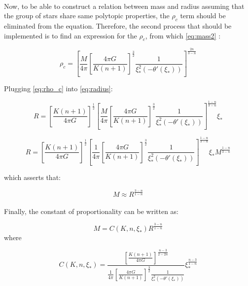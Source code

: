 \documentclass[letterpaper,12pt]{article}
\begin{document}
\paragraph{} Now, to be able to construct a relation between mass and radius assuming that the group of stars share same polytopic properties, the $\rho_c$ term should be eliminated from the equation. Therefore, the second process that should be implemented is to find an expression for the $\rho_c$, from which \eqref{eq:mass2} :

\begin{equation}
    \label{eq:rho_c}
    \rho_c = \left[\frac{M}{4 \pi} \left[\frac{4 \pi G}{K \left(n+1\right)}\right]^{\frac{3}{2}}  \frac{1}{\xi_*^2\left(-\theta'(\xi_*)\right)}\right]^{\frac{2n}{3-n}}
\end{equation}

Plugging \eqref{eq:rho_c} into \eqref{eq:radius}:

\begin{equation*}
    R = \left[\frac{K \left(n+1\right)}{4 \pi G}\right]^{\frac{1}{2}} \left[\frac{M}{4 \pi} \left[\frac{4 \pi G}{K \left(n+1\right)}\right]^{\frac{3}{2}}  \frac{1}{\xi_*^2\left(-\theta'(\xi_*)\right)}\right]^{\frac{1-n}{3-n}} \xi_* 
\end{equation*}

\begin{equation*}
    R =  \left[\frac{K \left(n+1\right)}{4 \pi G}\right]^{\frac{1}{2}} \left[\frac{1}{4 \pi} \left[\frac{4 \pi G}{K \left(n+1\right)}\right]^{\frac{3}{2}}  \frac{1}{\xi_*^2\left(-\theta'(\xi_*)\right)}\right]^{\frac{1-n}{3-n}} \xi_* M^{\frac{1-n}{3-n}} 
\end{equation*}

which asserts that:

\begin{equation*}
    M \approx R^{\frac{3-n}{1-n}}
\end{equation*}

\paragraph{} Finally, the constant of proportionality can be written as:

\begin{equation*}
    M = C(K, n, \xi_*) R^{\frac{3-n}{1-n}} 
\end{equation*}
where 

\begin{equation*}
  \boxed{  C(K, n, \xi_*) = \frac{ \left[\frac{K \left(n+1\right)}{4 \pi G}\right]^{\frac{n-3}{2 - 2n}} }{\frac{1}{4 \pi} \left[\frac{4 \pi G}{K \left(n+1\right)}\right]^{\frac{3}{2}}  \frac{1}{\xi_*^2\left(-\theta'(\xi_*)\right)}} \xi_*^{\frac{n-3}{1-n}} }
\end{equation*}
\end{document}
